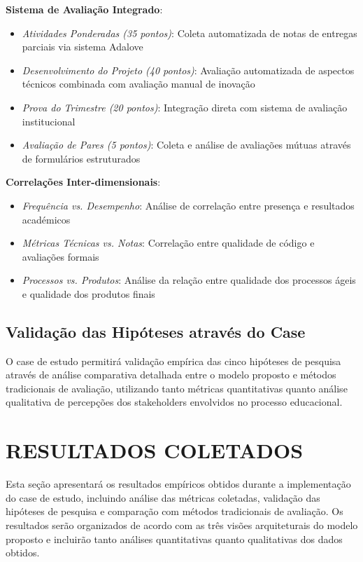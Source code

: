 \documentclass[12pt, a4paper, oneside, brazilian]{abntex2}
\begin{document}
\textbf{Sistema de Avaliação Integrado}:
\begin{itemize}
\item \textit{Atividades Ponderadas (35 pontos)}: Coleta automatizada de notas de entregas parciais via sistema Adalove
\item \textit{Desenvolvimento do Projeto (40 pontos)}: Avaliação automatizada de aspectos técnicos combinada com avaliação manual de inovação
\item \textit{Prova do Trimestre (20 pontos)}: Integração direta com sistema de avaliação institucional
\item \textit{Avaliação de Pares (5 pontos)}: Coleta e análise de avaliações mútuas através de formulários estruturados
\end{itemize}

\textbf{Correlações Inter-dimensionais}:
\begin{itemize}
\item \textit{Frequência vs. Desempenho}: Análise de correlação entre presença e resultados académicos
\item \textit{Métricas Técnicas vs. Notas}: Correlação entre qualidade de código e avaliações formais
\item \textit{Processos vs. Produtos}: Análise da relação entre qualidade dos processos ágeis e qualidade dos produtos finais
\end{itemize}

\subsection{Validação das Hipóteses através do Case}

O case de estudo permitirá validação empírica das cinco hipóteses de pesquisa através de análise comparativa detalhada entre o modelo proposto e métodos tradicionais de avaliação, utilizando tanto métricas quantitativas quanto análise qualitativa de percepções dos stakeholders envolvidos no processo educacional.

\section{RESULTADOS COLETADOS}

Esta seção apresentará os resultados empíricos obtidos durante a implementação do case de estudo, incluindo análise das métricas coletadas, validação das hipóteses de pesquisa e comparação com métodos tradicionais de avaliação. Os resultados serão organizados de acordo com as três visões arquiteturais do modelo proposto e incluirão tanto análises quantitativas quanto qualitativas dos dados obtidos.
\end{document}
